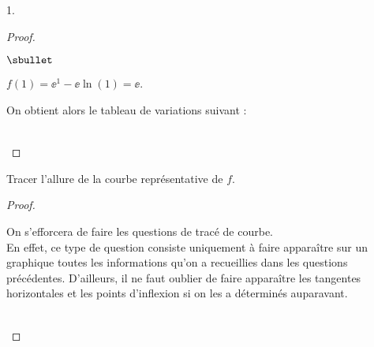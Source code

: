\begin{noliste}{1.}
\begin{proof}
\begin{noliste}{$\sbullet$}
    \item $f(1)=\ee^1-\ee\ln(1)=\ee$.
    \end{noliste}
    
    On obtient alors le tableau de variations suivant :
    
    \begin{center}
    \end{center}~\\[-1.4cm]
  \end{proof}
  
\item Tracer l'allure de la courbe représentative de $f$.
  
  \begin{proof}~
 
    \begin{center}
      \shorthandoff{;}
    \end{center}
    
    
    \newpage
    
    
    \begin{remark}
      On s'efforcera de faire les questions de tracé de courbe.\\
      En effet, ce type de question consiste uniquement à faire
      apparaître sur un graphique toutes les informations qu'on a
      recueillies dans les questions précédentes. D'ailleurs, il ne
      faut oublier de faire apparaître les tangentes horizontales  
      et les points d'inflexion si on les a déterminés auparavant.
    \end{remark}~\\[-1.2cm]
  \end{proof}
    

\end{noliste}

